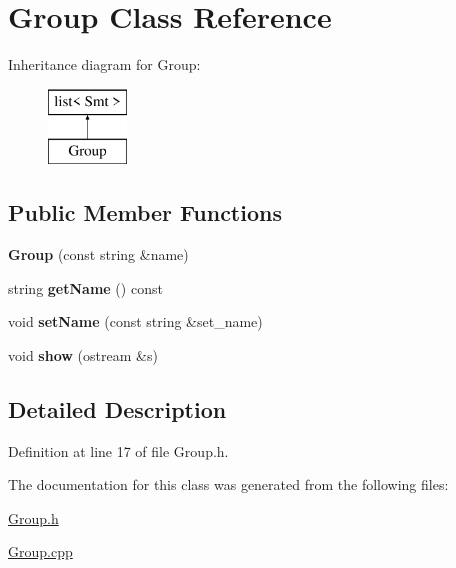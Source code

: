 \hypertarget{class_group}{}\section{Group Class Reference}
\label{class_group}
Inheritance diagram for Group\+:\begin{figure}[H]
\begin{center}
\leavevmode
\includegraphics[height=2.000000cm]{class_group}
\end{center}
\end{figure}
\subsection*{Public Member Functions}
\begin{DoxyCompactItemize}
\item 
\mbox{\label{class_group_a39292e9ef457791fcce88cf27943b993}} 
{\bfseries Group} (const string \&name)
\item 
\mbox{\label{class_group_a0c53394616dda01965f5906f2d98d835}} 
string {\bfseries get\+Name} () const
\item 
\mbox{\label{class_group_a1930c55bcefef500bf659768cc5d56c2}} 
void {\bfseries set\+Name} (const string \&set\+\_\+name)
\item 
\mbox{\label{class_group_acd917292c2ae08560aaf512b71fa3efd}} 
void {\bfseries show} (ostream \&s)
\end{DoxyCompactItemize}


\subsection{Detailed Description}


Definition at line 17 of file Group.\+h.



The documentation for this class was generated from the following files\+:\begin{DoxyCompactItemize}
\item 
\mbox{\hyperlink{_group_8h}{Group.\+h}}\item 
\mbox{\hyperlink{_group_8cpp}{Group.\+cpp}}\end{DoxyCompactItemize}
